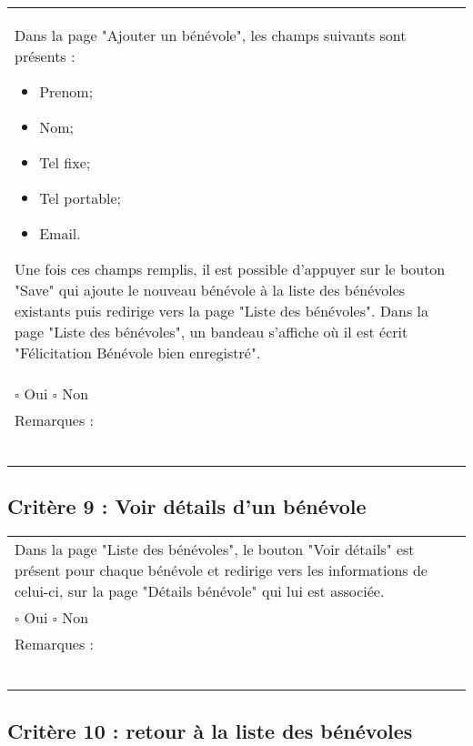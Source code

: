 	\begin{center}
    	 		\begin{tabular}[h]{|p{}|}
			\hline
				Dans la page "Ajouter un bénévole", les champs suivants sont présents : 
				\begin{itemize}
					\item Prenom;
					\item Nom;
					\item Tel fixe;
					\item Tel portable;
					\item Email.
				\end{itemize}
				Une fois ces champs remplis, il est possible d'appuyer sur le bouton "Save" qui ajoute le nouveau bénévole à la liste des bénévoles existants puis redirige vers la page "Liste des bénévoles". Dans la page "Liste des bénévoles", un bandeau s'affiche où il est écrit "Félicitation Bénévole bien enregistré". \\
				$\square$ Oui  \hfill \hfill $\square$ Non \\\hline Remarques : \\ ~\\
			 \\\hline
     		\end{tabular}
  		\end{center}	
  		
  		
  		\subsection*{Critère 9 : Voir détails d'un bénévole}
	
	\begin{center}
    	 		\begin{tabular}[h]{|p{}|}
			\hline
				Dans la page "Liste des bénévoles", le bouton "Voir détails" est présent pour chaque bénévole et redirige vers les informations de celui-ci, sur la page "Détails bénévole" qui lui est associée.\\
				$\square$ Oui  \hfill \hfill $\square$ Non \\\hline Remarques : \\ ~\\
			 \\\hline
     		\end{tabular}
  		\end{center}	
  		
  		
  		\subsection*{Critère 10 : retour à la liste des bénévoles}
	
